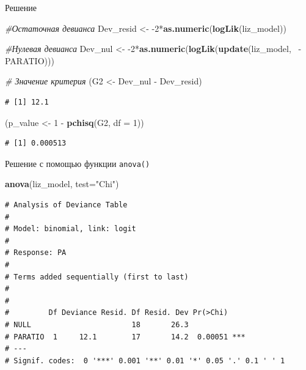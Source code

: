 \documentclass[ignorenonframetext,]{beamer}
\newenvironment{Shaded}{\begin{snugshade}}{\end{snugshade}}
\newcommand{\KeywordTok}[1]{\textcolor[rgb]{0.13,0.29,0.53}{\textbf{{#1}}}}
\newcommand{\DataTypeTok}[1]{\textcolor[rgb]{0.13,0.29,0.53}{{#1}}}
\newcommand{\DecValTok}[1]{\textcolor[rgb]{0.00,0.00,0.81}{{#1}}}
\newcommand{\StringTok}[1]{\textcolor[rgb]{0.31,0.60,0.02}{{#1}}}
\newcommand{\CommentTok}[1]{\textcolor[rgb]{0.56,0.35,0.01}{\textit{{#1}}}}
\newcommand{\NormalTok}[1]{{#1}}
\begin{document}
\begin{frame}[fragile]{Решение}

\begin{Shaded}
\begin{Highlighting}[]
\CommentTok{#Остаточная девианса}
\NormalTok{Dev_resid <-}\StringTok{ }\NormalTok{-}\DecValTok{2}\NormalTok{*}\KeywordTok{as.numeric}\NormalTok{(}\KeywordTok{logLik}\NormalTok{(liz_model)) }

\CommentTok{#Нулевая девианса}
\NormalTok{Dev_nul <-}\StringTok{ }\NormalTok{-}\DecValTok{2}\NormalTok{*}\KeywordTok{as.numeric}\NormalTok{(}\KeywordTok{logLik}\NormalTok{(}\KeywordTok{update}\NormalTok{(liz_model, ~-PARATIO)))}

\CommentTok{# Значение критерия }
\NormalTok{(G2 <-}\StringTok{ }\NormalTok{Dev_nul -}\StringTok{ }\NormalTok{Dev_resid)}
\end{Highlighting}
\end{Shaded}

\begin{verbatim}
# [1] 12.1
\end{verbatim}

\begin{Shaded}
\begin{Highlighting}[]
\NormalTok{(p_value <-}\StringTok{ }\DecValTok{1} \NormalTok{-}\StringTok{ }\KeywordTok{pchisq}\NormalTok{(G2, }\DataTypeTok{df =} \DecValTok{1}\NormalTok{))}
\end{Highlighting}
\end{Shaded}

\begin{verbatim}
# [1] 0.000513
\end{verbatim}

\end{frame}

\begin{frame}[fragile]{Решение с помощью функции \texttt{anova()}}

\begin{Shaded}
\begin{Highlighting}[]
\KeywordTok{anova}\NormalTok{(liz_model, }\DataTypeTok{test=}\StringTok{"Chi"}\NormalTok{)}
\end{Highlighting}
\end{Shaded}

\begin{verbatim}
# Analysis of Deviance Table
# 
# Model: binomial, link: logit
# 
# Response: PA
# 
# Terms added sequentially (first to last)
# 
# 
#         Df Deviance Resid. Df Resid. Dev Pr(>Chi)    
# NULL                       18       26.3             
# PARATIO  1     12.1        17       14.2  0.00051 ***
# ---
# Signif. codes:  0 '***' 0.001 '**' 0.01 '*' 0.05 '.' 0.1 ' ' 1
\end{verbatim}

\end{frame}
\end{document}
